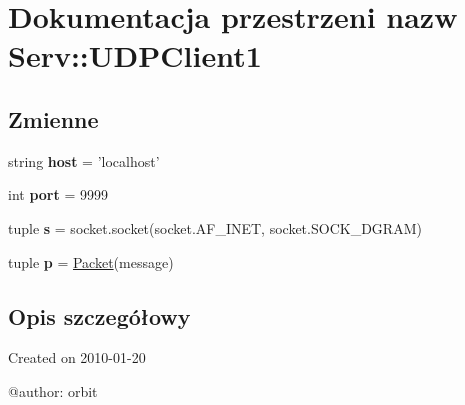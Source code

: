 \hypertarget{namespace_serv_1_1_u_d_p_client1}{
\section{Dokumentacja przestrzeni nazw Serv::UDPClient1}
\label{namespace_serv_1_1_u_d_p_client1}
}
\subsection*{Zmienne}
\begin{DoxyCompactItemize}
\item 
\hypertarget{namespace_serv_1_1_u_d_p_client1_a1c083a48b797a20f54695f5f04a55fbd}{
string {\bfseries host} = 'localhost'}
\label{namespace_serv_1_1_u_d_p_client1_a1c083a48b797a20f54695f5f04a55fbd}

\item 
\hypertarget{namespace_serv_1_1_u_d_p_client1_a19ea7a101002ec92988b4b88c69f56cd}{
int {\bfseries port} = 9999}
\label{namespace_serv_1_1_u_d_p_client1_a19ea7a101002ec92988b4b88c69f56cd}

\item 
\hypertarget{namespace_serv_1_1_u_d_p_client1_a30d457e78e8df51c992f0481290cdf21}{
tuple {\bfseries s} = socket.socket(socket.AF\_\-INET, socket.SOCK\_\-DGRAM)}
\label{namespace_serv_1_1_u_d_p_client1_a30d457e78e8df51c992f0481290cdf21}

\item 
\hypertarget{namespace_serv_1_1_u_d_p_client1_af17cbd754c908d1407b2b97f5ed053fe}{
tuple {\bfseries p} = \hyperlink{class_serv_1_1_packet_1_1_packet}{Packet}(message)}
\label{namespace_serv_1_1_u_d_p_client1_af17cbd754c908d1407b2b97f5ed053fe}

\end{DoxyCompactItemize}


\subsection{Opis szczegółowy}
\begin{DoxyVerb}
Created on 2010-01-20

@author: orbit
\end{DoxyVerb}
 